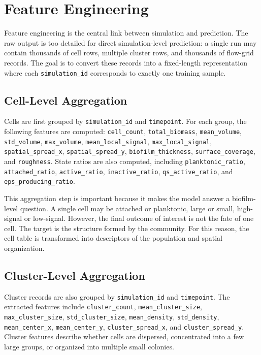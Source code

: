 \documentclass[12pt,a4paper,oneside]{report}
\begin{document}
\section{Feature Engineering}
Feature engineering is the central link between simulation and prediction. The raw output is too detailed for direct simulation-level prediction: a single run may contain thousands of cell rows, multiple cluster rows, and thousands of flow-grid records. The goal is to convert these records into a fixed-length representation where each \texttt{simulation\_id} corresponds to exactly one training sample.

\subsection{Cell-Level Aggregation}
Cells are first grouped by \texttt{simulation\_id} and \texttt{timepoint}. For each group, the following features are computed: \texttt{cell\_count}, \texttt{total\_biomass}, \texttt{mean\_volume}, \texttt{std\_volume}, \texttt{max\_volume}, \texttt{mean\_local\_signal}, \texttt{max\_local\_signal}, \texttt{spatial\_spread\_x}, \texttt{spatial\_spread\_y}, \texttt{biofilm\_thickness}, \texttt{surface\_coverage}, and \texttt{roughness}. State ratios are also computed, including \texttt{planktonic\_ratio}, \texttt{attached\_ratio}, \texttt{active\_ratio}, \texttt{inactive\_ratio}, \texttt{qs\_active\_ratio}, and \texttt{eps\_producing\_ratio}.

This aggregation step is important because it makes the model answer a biofilm-level question. A single cell may be attached or planktonic, large or small, high-signal or low-signal. However, the final outcome of interest is not the fate of one cell. The target is the structure formed by the community. For this reason, the cell table is transformed into descriptors of the population and spatial organization.

\subsection{Cluster-Level Aggregation}
Cluster records are also grouped by \texttt{simulation\_id} and \texttt{timepoint}. The extracted features include \texttt{cluster\_count}, \texttt{mean\_cluster\_size}, \texttt{max\_cluster\_size}, \texttt{std\_cluster\_size}, \texttt{mean\_density}, \texttt{std\_density}, \texttt{mean\_center\_x}, \texttt{mean\_center\_y}, \texttt{cluster\_spread\_x}, and \texttt{cluster\_spread\_y}. Cluster features describe whether cells are dispersed, concentrated into a few large groups, or organized into multiple small colonies.
\end{document}
